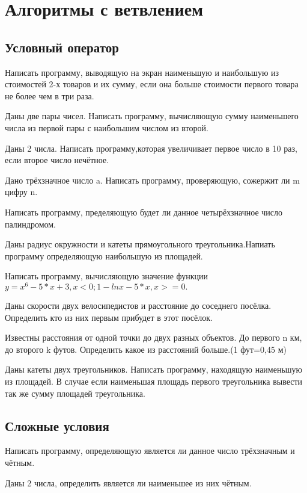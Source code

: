 \section{Алгоритмы с ветвлением}

\subsection{Условный оператор}

\task Написать программу, выводящую на экран наименьшую и наибольшую
из стоимостей 2-х товаров и их сумму, если она больше стоимости
первого товара не более чем в три раза.

\task Даны две пары чисел. Написать программу, вычисляющую сумму
наименьшего числа из первой пары с наибольшим числом из второй.

\task Даны 2 числа. Написать программу,которая увеличивает первое
число в 10 раз, если второе число нечётное.

\task Дано трёхзначное число a. Написать программу, проверяющую,
сожержит ли m цифру n.

\task Написать программу, пределяющую будет ли данное четырёхзначное
число палиндромом.

\task Даны радиус окружности и катеты прямоугольного
треугольника.Напиать программу определяющую наибольшую из площадей.

\task Написать программу, вычисляющую значение функции $y= x^6-5*x+3,
x<0; 1-lnx-5*x, x>=0.$

\task Даны скорости двух велосипедистов и расстояние до соседнего
посёлка. Определить кто из них первым прибудет в этот посёлок.

\task Известны расстояния от одной точки до двух разных объектов. До
первого n км, до второго k футов. Определить какое из расстояний
больше.(1 фут=0,45 м)

\task Даны катеты двух треугольников. Написать программу, находящую
наименьшую из площадей. В случае если наименьшая площадь первого
треугольника вывести так же сумму площадей треугольника.

\subsection{Сложные условия}

\task Написать программу, определяющую является ли данное число
трёхзначным и чётным.

\task Даны 2 числа, определить является ли наименьшее из них чётным.

